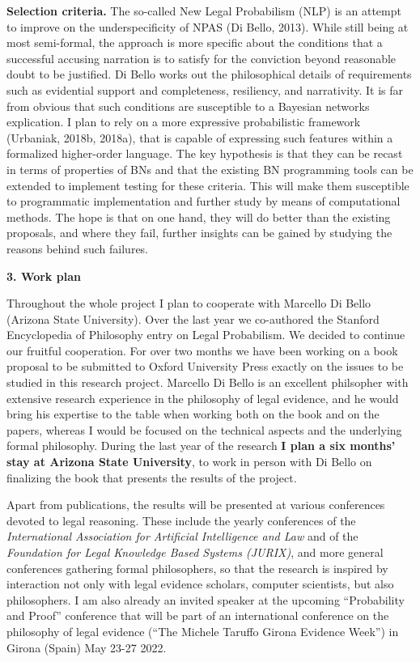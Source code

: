 \documentclass[11pt,dvipsnames,enabledeprecatedfontcommands]{scrartcl}
\begin{document}
\noindent
 \textbf{Selection criteria.} The so-called New Legal Probabilism (NLP)
is an attempt to improve on the underspecificity of NPAS (Di Bello,
2013). While still being at most semi-formal, the approach is more
specific about the conditions that a successful accusing narration is to
satisfy for the conviction beyond reasonable doubt to be justified. Di
Bello works out the philosophical details of requirements such as
evidential support and completeness, resiliency, and narrativity. It is
far from obvious that such conditions are susceptible to a Bayesian
networks explication. I plan to rely on a more expressive probabilistic
framework (Urbaniak, 2018b, 2018a), that is capable of expressing such
features within a formalized higher-order language. The key hypothesis
is that they can be recast in terms of properties of BNs and that the
existing BN programming tools can be extended to implement testing for
these criteria. This will make them susceptible to programmatic
implementation and further study by means of computational methods. The
hope is that on one hand, they will do better than the existing
proposals, and where they fail, further insights can be gained by
studying the reasons behind such failures.

\vspace{1mm}

\noindent \Large \textbf{3. Work plan}

\vspace{1mm} \normalsize

Throughout the whole project I plan to cooperate with Marcello Di Bello
(Arizona State University). Over the last year we co-authored the
Stanford Encyclopedia of Philosophy entry on Legal Probabilism. We
decided to continue our fruitful cooperation. For over two months we
have been working on a book proposal to be submitted to Oxford
University Press exactly on the issues to be studied in this research
project. Marcello Di Bello is an excellent philsopher with extensive
research experience in the philosophy of legal evidence, and he would
bring his expertise to the table when working both on the book and on
the papers, whereas I would be focused on the technical aspects and the
underlying formal philosophy. During the last year of the research
\textbf{I plan a six months' stay at Arizona State University}, to work
in person with Di Bello on finalizing the book that presents the results
of the project.

Apart from publications, the results will be presented at various
conferences devoted to legal reasoning. These include the yearly
conferences of the
\emph{International Association for Artificial Intelligence and Law} and
of the \emph{Foundation for Legal Knowledge Based Systems (JURIX)}, and
more general conferences gathering formal philosophers, so that the
research is inspired by interaction not only with legal evidence
scholars, computer scientists, but also philosophers. I am also already
an invited speaker at the upcoming ``Probability and Proof'' conference
that will be part of an international conference on the philosophy of
legal evidence (``The Michele Taruffo Girona Evidence Week'') in Girona
(Spain) May 23-27 2022.
\end{document}
